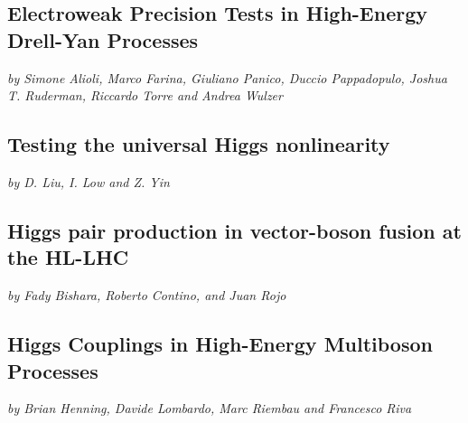 \documentclass[../report.tex]{subfiles}
\providecommand{\main}{..}
\begin{document}
\subsection{Electroweak Precision Tests  in High-Energy Drell-Yan Processes} \label{DY}
\begin{center}
{\it by Simone Alioli, Marco Farina,  Giuliano Panico,  Duccio Pappadopulo,
  Joshua T. Ruderman, Riccardo Torre and Andrea Wulzer}
\end{center}



\subsection{Testing the universal Higgs nonlinearity}
% 
\label{sect-illus}
\begin{center}
 {\it by D. Liu,   I. Low and Z. Yin
}
\end{center}





\subsection{Higgs pair production in vector-boson fusion at the HL-LHC}
\begin{center}
\textit{by Fady Bishara, Roberto Contino, and Juan Rojo}
\end{center}\label{sec:VVHHcont}





\subsection{Higgs Couplings in High-Energy Multiboson Processes} \label{HwH}
\begin{center}
{\it by Brian Henning,  Davide  Lombardo,  Marc Riembau and
  Francesco Riva}
\end{center}

\end{document}
